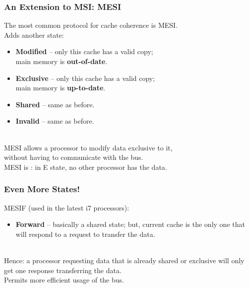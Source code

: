 \begin{frame}
  \frametitle{An Extension to MSI: MESI}

  
    The most common protocol for cache coherence is MESI.\\[1em]
    Adds another state:
      \begin{itemize}
        \item {\bf Modified} -- only this cache has a valid copy; \\
\qquad main memory is {\bf out-of-date}.
        \item {\bf Exclusive} -- only this cache has a valid copy; \\
\qquad main memory is {\bf up-to-date}.
        \item {\bf Shared} -- same as before.
        \item {\bf Invalid} -- same as before.
      \end{itemize}
~\\

    MESI allows a processor to modify data exclusive to it, \\without
      having to communicate with the bus.\\
    MESI is : in E state, no other processor has the
      data.
  
\end{frame}

\begin{frame}
  \frametitle{Even More States!}

  
    MESIF (used in the latest i7 processors):
      \begin{itemize}
        \item {\bf Forward} -- basically a shared state; but, current
          cache is the only one that will respond to a request to
          transfer the data.
      \end{itemize}~\\[1em]

    Hence: a processor requesting data that is already shared or exclusive will
      only get one response transferring the data.\\[1em]
    Permits more efficient usage of the bus.
  
\end{frame}



